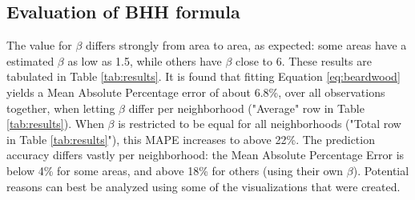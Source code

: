 \subsection{Evaluation of BHH formula}
The value for $\beta$ differs strongly from area to area, as expected: some areas have a estimated $\beta$ as low as 1.5, while others have $\beta$ close to 6.
These results are tabulated in Table \ref{tab:results}.
It is found that fitting Equation \ref{eq:beardwood} yields a Mean Absolute Percentage error of about 6.8\%, over all observations together, when
letting $\beta$ differ per neighborhood ("Average" row in Table \ref{tab:results}).
When $\beta$ is restricted to be equal for all neighborhoods ("Total row in Table \ref{tab:results}"), this MAPE increases to above 22\%.
The prediction accuracy differs vastly per neighborhood: the Mean Absolute Percentage Error is below 4\% for some areas, and above 18\% for others
(using their own $\beta$).
Potential reasons can best be analyzed using some of the visualizations that were created.

